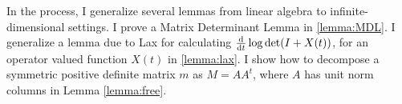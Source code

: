 

In the process, I generalize several lemmas from linear algebra to
infinite-dimensional settings. I prove a Matrix Determinant Lemma in
\ref{lemma:MDL}. I generalize a lemma due to Lax \cite{Lax07} for
calculating $\frac{\text{\textup{d}}}{\text{\textup{d}} t} \log \det (I + X(t))$, for an
operator valued function $X(t)$ in \ref{lemma:lax}. I show how to
decompose a symmetric positive definite matrix $m$ as $M = AA^t$,
where $A$ has unit norm columns in Lemma \ref{lemma:free}.

